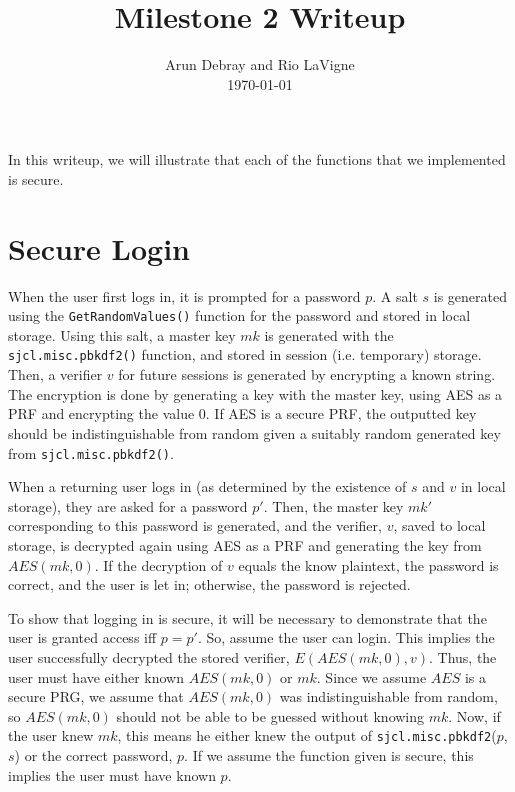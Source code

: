 \documentclass{amsart}
\begin{document}
\title{Milestone 2 Writeup}
\author{Arun Debray and Rio LaVigne\\\today}
\maketitle
In this writeup, we will illustrate that each of the functions that we implemented is secure.
\section{Secure Login}%
When the user first logs in, it is prompted for a password $p$. A salt $s$ is generated using the \verb+GetRandomValues()+ function for the password and stored in local storage. Using this salt, a master key $mk$ is generated with the \verb+sjcl.misc.pbkdf2()+ function, and stored in session (i.e. temporary) storage. Then, a verifier $v$ for future sessions is generated by encrypting a known string. The encryption is done by generating a key with the master key, using AES as a PRF and encrypting the value 0. If AES is a secure PRF, the outputted key should be indistinguishable from random given a suitably random generated key from  \verb+sjcl.misc.pbkdf2()+.

When a returning user logs in (as determined by the existence of $s$ and $v$ in local storage), they are asked for a password $p'$. Then, the master key $mk'$ corresponding to this password is generated, and the verifier, $v$, saved to local storage, is decrypted again using AES as a PRF and generating the key from $AES(mk, 0)$. If the decryption of $v$ equals the know plaintext, the password is correct, and the user is let in; otherwise, the password is rejected.

To show that logging in is secure, it will be necessary to demonstrate that the user is granted access iff $p = p'$. So, assume the user can login. This implies the user successfully decrypted the stored verifier, $E(AES(mk, 0), v)$. Thus, the user must have either known $AES(mk, 0)$ or $mk$. Since we assume $AES$ is a secure PRG, we assume that $AES(mk, 0)$ was indistinguishable from random, so $AES(mk, 0)$ should not be able to be guessed without knowing $mk$. Now, if the user knew $mk$, this means he either knew the output of \verb+sjcl.misc.pbkdf2+($p$, $s$) or the correct password, $p$. If we assume the function given is secure, this implies the user must have known $p$. %

\end{document}
